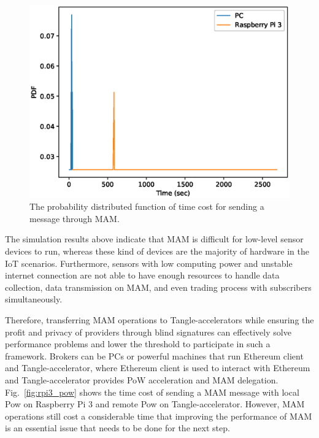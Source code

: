\begin{spacing}{2.0}
\begin{figure}[H]
    \centering
    \includegraphics[width=5.in]{img/mam_send}
    \caption{The probability distributed function of time cost for sending a message through MAM.}
    \label{fig:mam_send}
\end{figure}

The simulation results above indicate that MAM is difficult for low-level sensor devices to run, whereas these kind of devices are the majority of hardware in the IoT scenarios. Furthermore, sensors with low computing power and unstable internet connection are not able to have enough resources to handle data collection, data transmission on MAM, and even trading process with subscribers simultaneously.

Therefore, transferring MAM operations to Tangle-accelerators while ensuring the profit and privacy of providers through blind signatures can effectively solve performance problems and lower the threshold to participate in such a framework. Brokers can be PCs or powerful machines that run Ethereum client and Tangle-accelerator, where Ethereum client is used to interact with Ethereum and Tangle-accelerator provides PoW acceleration and MAM delegation. Fig.~\ref{fig:rpi3_pow} shows the time cost of sending a MAM message with local Pow on Raspberry Pi 3 and remote Pow on Tangle-accelerator. However, MAM operations still cost a considerable time that improving the performance of MAM is an essential issue that needs to be done for the next step.


\end{spacing}
